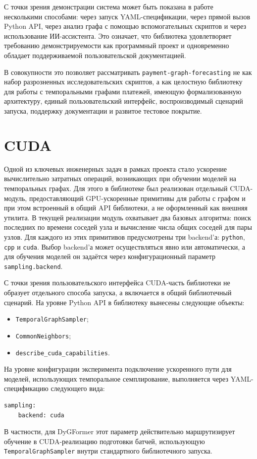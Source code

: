 \documentclass[a4paper,12pt]{extarticle}
\begin{document}
  С точки зрения демонстрации система может быть показана в работе несколькими способами: через запуск YAML-спецификации, через прямой вызов Python API, через анализ
  графа с помощью вспомогательных скриптов и через использование ИИ-ассистента. Это означает, что библиотека удовлетворяет требованию демонстрируемости как
  программный проект и одновременно обладает поддерживаемой пользовательской документацией.

  В совокупности это позволяет рассматривать \texttt{payment-graph-forecasting} не как набор разрозненных исследовательских скриптов, а как целостную библиотеку для
  работы с темпоральными графами платежей, имеющую формализованную архитектуру, единый пользовательский интерфейс, воспроизводимый сценарий запуска, поддержку
  документации и развитое тестовое покрытие.

\section{CUDA}

Одной из ключевых инженерных задач в рамках проекта стало ускорение вычислительно затратных операций, возникающих при обучении моделей на темпоральных графах. Для
  этого в библиотеке был реализован отдельный CUDA-модуль, предоставляющий GPU-ускоренные примитивы для работы с графом и при этом встроенный в общий API библиотеки,
  а не оформленный как внешняя утилита. В текущей реализации модуль охватывает два базовых алгоритма: поиск последних по времени соседей узла и вычисление числа
  общих соседей для пары узлов. Для каждого из этих примитивов предусмотрены три backend'а: \texttt{python}, \texttt{cpp} и \texttt{cuda}. Выбор backend'а может
  осуществляться явно или автоматически, а для обучения моделей он задаётся через конфигурационный параметр \texttt{sampling.backend}.

  С точки зрения пользовательского интерфейса CUDA-часть библиотеки не образует отдельного способа запуска, а включается в общий библиотечный сценарий. На уровне
  Python API в библиотеку вынесены следующие объекты:
  \begin{itemize}
      \item \texttt{TemporalGraphSampler};
      \item \texttt{CommonNeighbors};
      \item \texttt{describe\_cuda\_capabilities}.
  \end{itemize}
  На уровне конфигурации эксперимента подключение ускоренного пути для моделей, использующих темпоральное семплирование, выполняется через YAML-спецификацию
  следующего вида:
  \begin{lstlisting}[basicstyle=\ttfamily\small,frame=single]
  sampling:
    backend: cuda
  \end{lstlisting}
  В частности, для DyGFormer этот параметр действительно маршрутизирует обучение в CUDA-реализацию подготовки батчей, использующую \texttt{TemporalGraphSampler}
  внутри стандартного библиотечного запуска.
\end{document}
